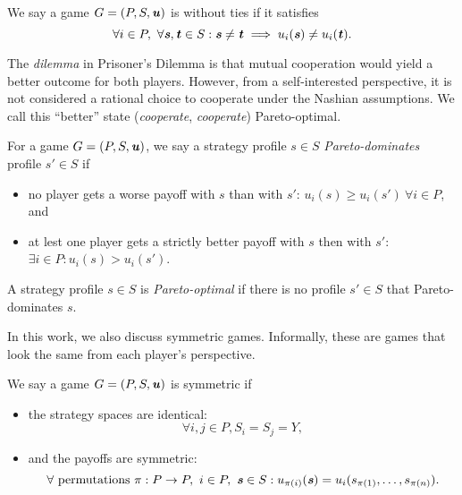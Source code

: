 \begin{definition}
  We say a game $G = (P, S, \boldsymbol{\mathit{u}})$ is without ties if it satisfies
  \[
    \forall i \in P,\ \forall \boldsymbol{\mathit{s}}, \boldsymbol{\mathit{t}} \in S: \boldsymbol{\mathit{s}} \ne \boldsymbol{\mathit{t}} \implies u_i(\boldsymbol{\mathit{s}}) \ne u_i(\boldsymbol{\mathit{t}}).
  \]
\end{definition}

The \textit{dilemma} in Prisoner's Dilemma is that mutual cooperation would yield a better outcome for both players.
However, from a self-interested perspective, it is not considered a rational choice to cooperate under the Nashian assumptions.
We call this \enquote{better} state (\textit{cooperate}, \textit{cooperate}) Pareto-optimal.

\begin{definition}
  For a game $G = (P, S, \boldsymbol{\mathit{u}})$, we say a strategy profile $s \in S$ \textit{Pareto-dominates} profile $s' \in S$ if
  \begin{itemize}
    \item no player gets a worse payoff with $s$ than with $s'$: $u_i(s) \ge u_i(s')\ \forall i \in P$, and
    \item at lest one player gets a strictly better payoff with $s$ then with $s'$: $\exists i \in P: u_i(s) > u_i(s')$.
  \end{itemize}
  A strategy profile $s \in S$ is \textit{Pareto-optimal} if there is no profile $s' \in S$ that Pareto-dominates $s$.
\end{definition}

In this work, we also discuss symmetric games.
Informally, these are games that look the same from each player's perspective.

\begin{definition}
  We say a game $G = (P, S, \boldsymbol{\mathit{u}})$ is symmetric if
  \begin{itemize}
    \item the strategy spaces are identical:
    $$\forall i, j \in P, S_i = S_j = Y,$$
    \item and the payoffs are symmetric:
    $$\forall \text{ permutations } \pi: P \to P,\ i \in P,\ \boldsymbol{\mathit{s}} \in S: u_{\pi(i)}(\boldsymbol{\mathit{s}}) = u_i(s_{\pi(1)}, \dots, s_{\pi(n)}).$$
\end{itemize}
\end{definition}

